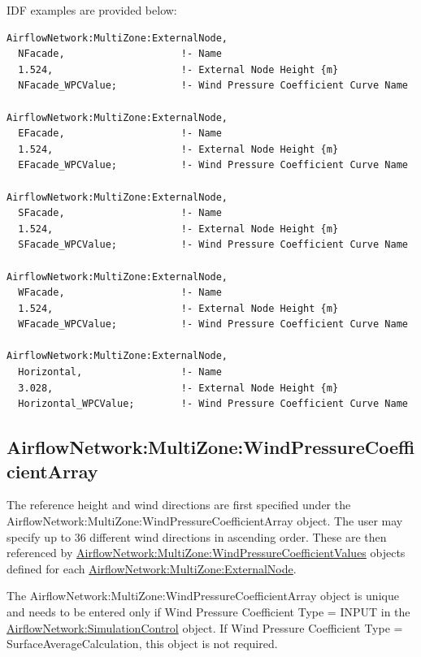 IDF examples are provided below:

\begin{lstlisting}
AirflowNetwork:MultiZone:ExternalNode,
  NFacade,                    !- Name
  1.524,                      !- External Node Height {m}
  NFacade_WPCValue;           !- Wind Pressure Coefficient Curve Name

AirflowNetwork:MultiZone:ExternalNode,
  EFacade,                    !- Name
  1.524,                      !- External Node Height {m}
  EFacade_WPCValue;           !- Wind Pressure Coefficient Curve Name

AirflowNetwork:MultiZone:ExternalNode,
  SFacade,                    !- Name
  1.524,                      !- External Node Height {m}
  SFacade_WPCValue;           !- Wind Pressure Coefficient Curve Name

AirflowNetwork:MultiZone:ExternalNode,
  WFacade,                    !- Name
  1.524,                      !- External Node Height {m}
  WFacade_WPCValue;           !- Wind Pressure Coefficient Curve Name

AirflowNetwork:MultiZone:ExternalNode,
  Horizontal,                 !- Name
  3.028,                      !- External Node Height {m}
  Horizontal_WPCValue;        !- Wind Pressure Coefficient Curve Name
\end{lstlisting}

\subsection{AirflowNetwork:MultiZone:WindPressureCoefficientArray}\label{airflownetworkmultizonewindpressurecoefficientarray}

The reference height and wind directions are first specified under the AirflowNetwork:MultiZone:WindPressureCoefficientArray object. The user may specify up to 36 different wind directions in ascending order. These are then referenced by \hyperref[airflownetworkmultizonewindpressurecoefficientvalues]{AirflowNetwork:MultiZone:WindPressureCoefficientValues} objects defined for each \hyperref[airflownetworkmultizoneexternalnode]{AirflowNetwork:MultiZone:ExternalNode}.

The AirflowNetwork:MultiZone:WindPressureCoefficientArray object is unique and needs to be entered only if Wind Pressure Coefficient Type = INPUT in the \hyperref[airflownetworksimulationcontrol]{AirflowNetwork:\hyperref[simulationcontrol]{SimulationControl}} object. If Wind Pressure Coefficient Type = SurfaceAverageCalculation, this object is not required.

